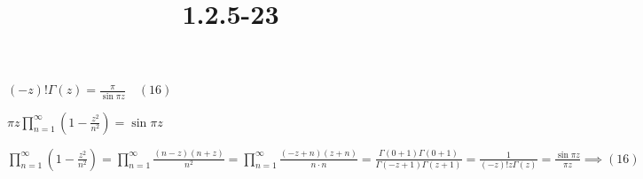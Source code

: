\documentclass{article}
\title{1.2.5-23}
\begin{document}
\maketitle

\( (-z)! \Gamma(z) = \frac{\pi}{\sin \pi z}\quad (16) \)

\( \pi z \prod_{n=1}^\infty (1- \frac{z^2}{n^2}) = \sin \pi z \)

\( \prod_{n=1}^\infty (1- \frac{z^2}{n^2}) = \prod_{n=1}^\infty \frac{(n-z)(n+z)}{n^2} = \prod_{n=1}^\infty \frac{(-z+n)(z+n)}{n \cdot n} = \frac{\Gamma(0+1)\Gamma(0+1)}{\Gamma(-z+1)\Gamma(z+1)} = \frac{1}{(-z)!z \Gamma(z)} = \frac{\sin \pi z}{\pi z} \implies (16) \)
\end{document}
